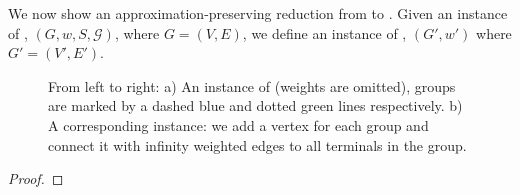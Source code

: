 We now show an approximation-preserving reduction from \ProbGroup{} to
\Prob{}.
Given an instance of \ProbGroup{}, $(G, w, S, \mathcal{G})$, where $G = (V, E)$, 
we define an instance of \Prob{},
$(G', w')$ where $G' = (V', E')$.


\begin{figure}
\begin{center}

\end{center}
\caption{\label{fig:prob-geq-group}
From left to right:
a) An instance of \ProbGroup{} (weights are omitted), 
groups are marked by a dashed blue and dotted green lines respectively.  
b) A corresponding \Prob{} instance: we add a vertex for each group and connect it 
with infinity weighted edges to all terminals in the group.   
}
\end{figure}

\begin{claim}
\end{claim}

\begin{proof}
\end{proof}
 